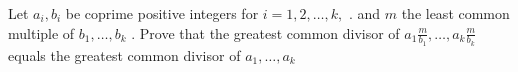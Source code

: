 \documentclass[a4paper]{article}
\begin{document}
Let $a_{i}, b_{i}$ be coprime positive integers for $i=1, 2, \ldots, k,$ .
and $m$ the least common multiple of $b_{1}, \ldots, b_{k}$ . 
Prove that the greatest common divisor of $a_{1} \frac{m} {b_{1}}, \dots, a_{k} \frac{m}{b_{k}}$ 
equals the greatest common divisor of $a_{1}, \ldots, a_{k}$
\end{document}
